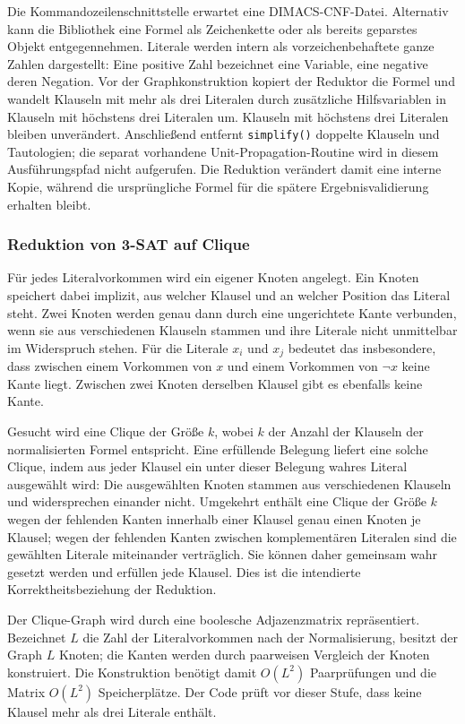 \documentclass[a4paper,12pt]{article}
\theoremstyle{definition}
\begin{document}
Die Kommandozeilenschnittstelle erwartet eine DIMACS-CNF-Datei. Alternativ kann die Bibliothek eine Formel als Zeichenkette oder als bereits geparstes Objekt entgegennehmen. Literale werden intern als vorzeichenbehaftete ganze Zahlen dargestellt: Eine positive Zahl bezeichnet eine Variable, eine negative deren Negation. Vor der Graphkonstruktion kopiert der Reduktor die Formel und wandelt Klauseln mit mehr als drei Literalen durch zusätzliche Hilfsvariablen in Klauseln mit höchstens drei Literalen um. Klauseln mit höchstens drei Literalen bleiben unverändert. Anschließend entfernt \texttt{simplify()} doppelte Klauseln und Tautologien; die separat vorhandene Unit-Propagation-Routine wird in diesem Ausführungspfad nicht aufgerufen. Die Reduktion verändert damit eine interne Kopie, während die ursprüngliche Formel für die spätere Ergebnisvalidierung erhalten bleibt.

\subsubsection{Reduktion von 3-SAT auf Clique}

Für jedes Literalvorkommen wird ein eigener Knoten angelegt. Ein Knoten speichert dabei implizit, aus welcher Klausel und an welcher Position das Literal steht. Zwei Knoten werden genau dann durch eine ungerichtete Kante verbunden, wenn sie aus verschiedenen Klauseln stammen und ihre Literale nicht unmittelbar im Widerspruch stehen. Für die Literale $x_i$ und $x_j$ bedeutet das insbesondere, dass zwischen einem Vorkommen von $x$ und einem Vorkommen von $\neg x$ keine Kante liegt. Zwischen zwei Knoten derselben Klausel gibt es ebenfalls keine Kante.

Gesucht wird eine Clique der Größe $k$, wobei $k$ der Anzahl der Klauseln der normalisierten Formel entspricht. Eine erfüllende Belegung liefert eine solche Clique, indem aus jeder Klausel ein unter dieser Belegung wahres Literal ausgewählt wird: Die ausgewählten Knoten stammen aus verschiedenen Klauseln und widersprechen einander nicht. Umgekehrt enthält eine Clique der Größe $k$ wegen der fehlenden Kanten innerhalb einer Klausel genau einen Knoten je Klausel; wegen der fehlenden Kanten zwischen komplementären Literalen sind die gewählten Literale miteinander verträglich. Sie können daher gemeinsam wahr gesetzt werden und erfüllen jede Klausel. Dies ist die intendierte Korrektheitsbeziehung der Reduktion.

Der Clique-Graph wird durch eine boolesche Adjazenzmatrix repräsentiert. Bezeichnet $L$ die Zahl der Literalvorkommen nach der Normalisierung, besitzt der Graph $L$ Knoten; die Kanten werden durch paarweisen Vergleich der Knoten konstruiert. Die Konstruktion benötigt damit $O(L^2)$ Paarprüfungen und die Matrix $O(L^2)$ Speicherplätze. Der Code prüft vor dieser Stufe, dass keine Klausel mehr als drei Literale enthält.
\end{document}
